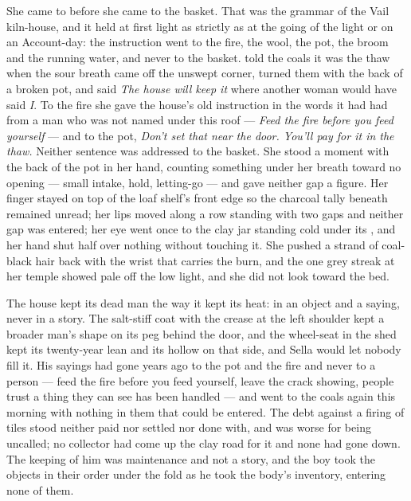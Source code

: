 \scenebreak

She came to  before she came to the basket. That was the grammar of the Vail kiln-house, and it held at first light as strictly as at the going of the light or on an Account-day: the instruction went to the fire, the wool, the pot, the broom and the running water, and never to the basket.  told the coals it was the thaw when the sour breath came off the unswept corner, turned them with the back of a broken pot, and said \emph{The house will keep it} where another woman would have said \emph{I}. To the fire she gave the house's old instruction in the words it had had from a man who was not named under this roof --- \emph{Feed the fire before you feed yourself} --- and to the pot, \emph{Don't set that near the door. You'll pay for it in the thaw.} Neither sentence was addressed to the basket. She stood a moment with the back of the pot in her hand, counting something under her breath toward no opening --- small intake, hold, letting-go --- and gave neither gap a figure. Her finger stayed on top of the loaf shelf's front edge so the charcoal tally beneath remained unread; her lips moved along a row standing with two gaps and neither gap was entered; her eye went once to the clay jar standing cold under its , and her hand shut half over nothing without touching it. She pushed a strand of coal-black hair back with the wrist that carries the burn, and the one grey streak at her temple showed pale off the low light, and she did not look toward the bed.

The house kept its dead man the way it kept its heat: in an object and a saying, never in a story. The salt-stiff coat with the crease at the left shoulder kept a broader man's shape on its peg behind the door, and the wheel-seat in the shed kept its twenty-year lean and its hollow on that side, and Sella would let nobody fill it. His sayings had gone years ago to the pot and the fire and never to a person --- feed the fire before you feed yourself, leave the crack showing, people trust a thing they can see has been handled --- and went to the coals again this morning with nothing in them that could be entered. The debt against a firing of tiles stood neither paid nor settled nor done with, and was worse for being uncalled; no collector had come up the clay road for it and none had gone down. The keeping of him was maintenance and not a story, and the boy took the objects in their order under the fold as he took the body's inventory, entering none of them.

